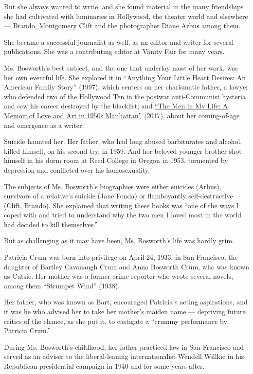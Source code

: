 But she always wanted to write, and she found material in the many
friendships she had cultivated with luminaries in Hollywood, the theater
world and elsewhere --- Brando, Montgomery Clift and the photographer
Diane Arbus among them.

She became a successful journalist as well, as an editor and writer for
several publications. She was a contributing editor at Vanity Fair for
many years.

Ms. Bosworth's best subject, and the one that underlay most of her work,
was her own eventful life. She explored it in ``Anything Your Little
Heart Desires: An American Family Story'' (1997), which centers on her
charismatic father, a lawyer who defended two of the Hollywood Ten in
the postwar anti-Communist hysteria and saw his career destroyed by the
blacklist; and
\href{https://www.nytimes.com/2017/01/24/books/review-patricia-bosworth-men-in-my-life.html}{``The
Men in My Life: A Memoir of Love and Art in 1950s Manhattan''} (2017),
about her coming-of-age and emergence as a writer.

Suicide haunted her. Her father, who had long abused barbiturates and
alcohol, killed himself, on his second try, in 1959. And her beloved
younger brother shot himself in his dorm room at Reed College in Oregon
in 1953, tormented by depression and conflicted over his homosexuality.

The subjects of Ms. Bosworth's biographies were either suicides (Arbus),
survivors of a relative's suicide (Jane Fonda) or flamboyantly
self-destructive (Clift, Brando). She explained that writing these books
was ``one of the ways I coped with and tried to understand why the two
men I loved most in the world had decided to kill themselves.''

But as challenging as it may have been, Ms. Bosworth's life was hardly
grim.

Patricia Crum was born into privilege on April 24, 1933, in San
Francisco, the daughter of Bartley Cavanaugh Crum and Anna Bosworth
Crum, who was known as Cutsie. Her mother was a former crime reporter
who wrote several novels, among them ``Strumpet Wind'' (1938).

Her father, who was known as Bart, encouraged Patricia's acting
aspirations, and it was he who advised her to take her mother's maiden
name --- depriving future critics of the chance, as she put it, to
castigate a ``crummy performance by Patricia Crum.''

During Ms. Bosworth's childhood, her father practiced law in San
Francisco and served as an adviser to the liberal-leaning
internationalist Wendell Willkie in his Republican presidential campaign
in 1940 and for some years after.

